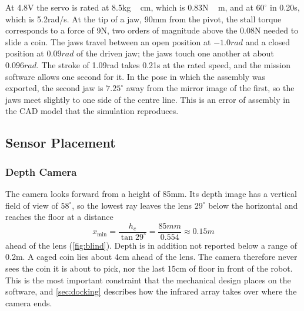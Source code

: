 At 4.8\unit{V} the servo is rated at 8.5\unit{kg\,cm}, which is 0.83\unit{N\,m}, and at
$60^\circ$ in 0.20\unit{s}, which is 5.2\unit{rad/s}. At the tip of a jaw, 90\unit{mm} from
the pivot, the stall torque corresponds to a force of 9\unit{N}, two orders of magnitude
above the 0.08\unit{N} needed to slide a coin. The jaws travel between an open position at
$-1.0\unit{rad}$ and a closed position at $0.09\unit{rad}$ of the driven jaw; the jaws touch
one another at about $0.096\unit{rad}$. The stroke of 1.09\unit{rad} takes 0.21\unit{s} at
the rated speed, and the mission software allows one second for it. In the pose in which the
assembly was exported, the second jaw is $7.25^\circ$ away from the mirror image of the
first, so the jaws meet slightly to one side of the centre line. This is an error of
assembly in the CAD model that the simulation reproduces.

\subsection{Sensor Placement}
\label{sec:sensors-mech}
\subsubsection{Depth Camera}
The camera looks forward from a height of 85\unit{mm}. Its depth image has a vertical field
of view of $58^\circ$, so the lowest ray leaves the lens $29^\circ$ below the horizontal and
reaches the floor at a distance
\begin{equation}
  x_{\min} = \frac{h_c}{\tan 29^\circ} = \frac{85\unit{mm}}{0.554} \approx 0.15\unit{m}
  \label{eq:blind}
\end{equation}
ahead of the lens (\cref{fig:blind}). Depth is in addition not reported below a range of
0.2\unit{m}. A caged coin lies about 4\unit{cm} ahead of the lens. The camera therefore
never sees the coin it is about to pick, nor the last 15\unit{cm} of floor in front of the
robot. This is the most important constraint that the mechanical design places on the
software, and \cref{sec:docking} describes how the infrared array takes over where the
camera ends.


